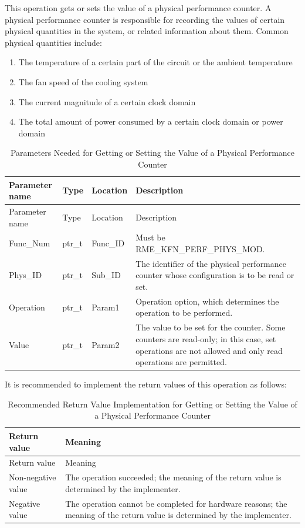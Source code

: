 This operation gets or sets the value of a physical performance counter. A physical performance counter is responsible for recording the values of certain physical quantities in the system, or related information about them. Common physical quantities include:

\begin{enumerate}
\def\labelenumi{\arabic{enumi}.}
\item
  The temperature of a certain part of the circuit or the ambient temperature
\item
  The fan speed of the cooling system
\item
  The current magnitude of a certain clock domain
\item
  The total amount of power consumed by a certain clock domain or power domain
\end{enumerate}

\begin{xltabular}{\textwidth}{@{}>{\hsize\raggedright\arraybackslash}X>{\hsize\raggedright\arraybackslash}X>{\hsize\raggedright\arraybackslash}X>{\hsize\raggedright\arraybackslash}X@{}}
\caption{Parameters Needed for Getting or Setting the Value of a Physical Performance Counter}\label{tab:8-68-get-or-set-physical-performance-counter-parameters}\\
\toprule
Parameter name & Type & Location & Description\tabularnewline
\endfirsthead
\toprule
Parameter name & Type & Location & Description\tabularnewline
\midrule
\endhead
\bottomrule
\endlastfoot
Func\_Num & ptr\_t & Func\_ID & Must be RME\_KFN\_PERF\_PHYS\_MOD.\tabularnewline
Phys\_ID & ptr\_t & Sub\_ID &
The identifier of the physical performance counter whose configuration is to be read or set.\tabularnewline
Operation & ptr\_t & Param1 &
Operation option, which determines the operation to be performed.\tabularnewline
Value & ptr\_t & Param2 &
The value to be set for the counter. Some counters are read-only; in this case, set operations are not allowed and only read operations are permitted.\tabularnewline
\end{xltabular}
\nopagebreak[4]

It is recommended to implement the return values of this operation as follows:

\begin{xltabular}{\textwidth}{@{}>{\hsize\raggedright\arraybackslash}X>{\hsize\raggedright\arraybackslash}X@{}}
\caption{Recommended Return Value Implementation for Getting or Setting the Value of a Physical Performance Counter}\label{tab:8-69-get-or-set-physical-performance-counter-suggested-return-values}\\
\toprule
Return value & Meaning\tabularnewline
\endfirsthead
\toprule
Return value & Meaning\tabularnewline
\midrule
\endhead
\bottomrule
\endlastfoot
    Non-negative value & The operation succeeded; the meaning of the return value is determined by the implementer.\tabularnewline
    Negative value & The operation cannot be completed for hardware reasons; the meaning of the return value is determined by the implementer.\tabularnewline
\end{xltabular}
\nopagebreak[4]


